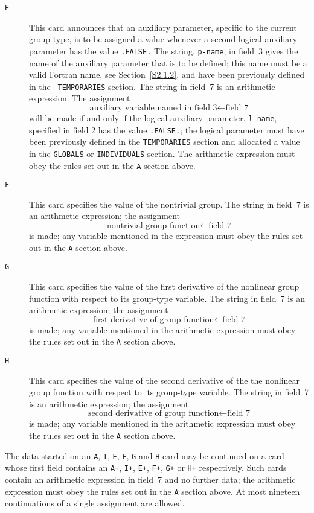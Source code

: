 \documentclass[a4paper]{article}
\newcommand{\itt}[1]{\item[\tt #1]}
\newcommand{\bdmath}{\begin{displaymath}}
\newcommand{\edmath}{\end{displaymath}}
\begin{document}
\begin{description}
\itt{E}
This  card
announces  that an auxiliary   parameter,  specific to the
current  group type,
is to be  assigned a  value   whenever   a second
logical auxiliary  parameter
has the  value  {\tt .FALSE.} The string,
{\tt p-name}, in field~3 gives  the name  of the auxiliary  parameter
that is  to be defined;  this name  must be a  valid Fortran name,
see
Section~\ref{S2.1.2}, and  have  been previously  defined  in the {\tt
TEMPORARIES}
section.  The string  in   field~7  is an arithmetic   expression. The
assignment
\bdmath
\mbox{auxiliary variable named in field~3} \leftarrow \mbox{field~7}
\edmath
will  be made if  and only if  the logical auxiliary  parameter,
{\tt l-name}, specified in field 2 has the value {\tt .FALSE.}; the logical
parameter
must have been  previously defined in the {\tt TEMPORARIES}
section  and allocated    a  value in  the   {\tt   GLOBALS}
or {\tt INDIVIDUALS}
section.  The arithmetic expression must obey the rules set out in the
{\tt A}
section above.

\itt{F}
This card
specifies the value of the nontrivial group.
The string in
field~7 is an arithmetic expression; the assignment
\bdmath
\mbox{nontrivial group function} \leftarrow \mbox{field~7}
\edmath
is made; any variable mentioned in  the expression must obey the rules
set out in the {\tt A}
section above.

\itt{G}
This card
specifies the value of the first derivative
of  the  nonlinear group  function  with  respect  to  its  group-type
variable.
The string  in  field~7  is  an arithmetic expression;  the
assignment
\bdmath
\mbox{first derivative of group function} \leftarrow \mbox{field~7}
\edmath
is made; any variable mentioned in the arithmetic expression must obey
the rules set out in the {\tt A}
section above.

\itt{H}
This card
specifies   the value of   the second derivative of the  the
nonlinear group function with respect to its group-type variable.
The
string in field~7 is an arithmetic expression; the assignment
\bdmath
\mbox{second derivative of group function} \leftarrow \mbox{field~7}
\edmath
is made; any variable mentioned in the arithmetic expression must obey
the rules  set  out  in the {\tt A}
section  above.
\end{description}

The data started on an {\tt A}, {\tt I}, {\tt E}, {\tt F}, {\tt  G} and
{\tt H} card
may be continued on a card  whose first field  contains an
{\tt A+}, {\tt   I+}, {\tt  E+},  {\tt  F+}, {\tt    G+} or {\tt   H+}
respectively.
Such cards
contain an arithmetic expression in  field~7 and no further
data; the arithmetic expression  must obey the  rules set out  in  the
{\tt A} section  above.  At most nineteen continuations  of  a  single
assignment are allowed.
\end{document}
